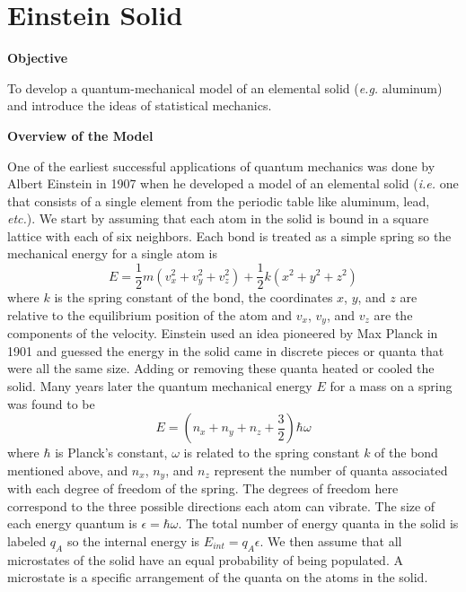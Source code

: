 \setcounter{equation}{0}
\setcounter{figure}{0}

\section{Einstein Solid}

\makelabheader %

\textbf{Objective}

To develop a quantum-mechanical model of an elemental solid ({\it e.g.} aluminum) and
introduce the ideas of statistical mechanics.

\textbf{Overview of the Model}

One of the earliest successful applications of quantum mechanics was done by Albert Einstein
in 1907 when he developed a model of an elemental solid ({\it i.e.} one that consists of a single
element from the periodic table like aluminum, lead, {\it etc.}).
We start by assuming that each atom in the solid is bound in a square lattice with each
of six neighbors. Each bond is treated as a simple spring so the 
mechanical energy for a single atom is
%
%
%
\begin{equation}
E = \frac{1}{2} m (v_x^2 + v_y^2 + v_z^2) + \frac{1}{2} k (x^2 + y^2 + z^2)
\end{equation}
where $k$ is the spring constant of the bond, the coordinates $x$, $y$, and $z$ are relative to the
equilibrium position of the atom and $v_x$, $v_y$, and $v_z$ are the components of the velocity.
Einstein used an idea pioneered by Max Planck in 1901 and
guessed the energy in the solid came in discrete pieces or quanta that were all
the same size.
Adding or removing these quanta heated or cooled the solid.
Many years later the quantum mechanical energy $E$ for a mass on a spring was found 
to be
\begin{equation}
E = (n_x + n_y + n_z + \frac{3}{2})\hbar \omega
\end{equation}
where $\hbar$ is Planck's constant, $\omega$ is related to the spring constant $k$ of the bond
mentioned
above, and $n_x$, $n_y$, and $n_z$ represent the number of quanta associated with each
degree of freedom of the spring.
The degrees of freedom here correspond to the three possible directions each atom can vibrate.
The size of each energy quantum is $\epsilon = \hbar \omega$.
The total number of energy quanta in the solid is labeled $q_A$ so the internal energy is
$E_{int} = q_A\epsilon$.
We then assume that all microstates of the solid have an equal probability of being populated.
A microstate is a specific arrangement of the quanta on the atoms in the solid.

